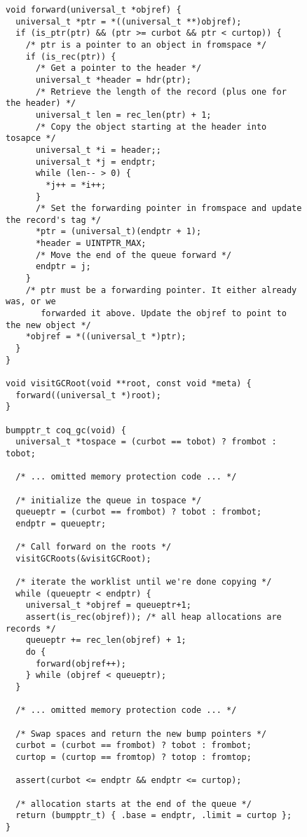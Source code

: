 \documentclass{article}
\begin{document}
\begin{figure}
\begin{lstlisting}
void forward(universal_t *objref) {
  universal_t *ptr = *((universal_t **)objref);
  if (is_ptr(ptr) && (ptr >= curbot && ptr < curtop)) {
    /* ptr is a pointer to an object in fromspace */
    if (is_rec(ptr)) {
      /* Get a pointer to the header */
      universal_t *header = hdr(ptr);
      /* Retrieve the length of the record (plus one for the header) */
      universal_t len = rec_len(ptr) + 1;
      /* Copy the object starting at the header into tosapce */
      universal_t *i = header;;
      universal_t *j = endptr;
      while (len-- > 0) {
        *j++ = *i++;
      }
      /* Set the forwarding pointer in fromspace and update the record's tag */
      *ptr = (universal_t)(endptr + 1);
      *header = UINTPTR_MAX;
      /* Move the end of the queue forward */
      endptr = j;
    }
    /* ptr must be a forwarding pointer. It either already was, or we 
       forwarded it above. Update the objref to point to the new object */
    *objref = *((universal_t *)ptr);
  }
}

void visitGCRoot(void **root, const void *meta) {
  forward((universal_t *)root);
}

bumpptr_t coq_gc(void) {
  universal_t *tospace = (curbot == tobot) ? frombot : tobot;

  /* ... omitted memory protection code ... */

  /* initialize the queue in tospace */
  queueptr = (curbot == frombot) ? tobot : frombot;
  endptr = queueptr;

  /* Call forward on the roots */
  visitGCRoots(&visitGCRoot);

  /* iterate the worklist until we're done copying */
  while (queueptr < endptr) {
    universal_t *objref = queueptr+1;
    assert(is_rec(objref)); /* all heap allocations are records */
    queueptr += rec_len(objref) + 1;
    do {
      forward(objref++);
    } while (objref < queueptr);
  }

  /* ... omitted memory protection code ... */

  /* Swap spaces and return the new bump pointers */
  curbot = (curbot == frombot) ? tobot : frombot;
  curtop = (curtop == fromtop) ? totop : fromtop;

  assert(curbot <= endptr && endptr <= curtop);

  /* allocation starts at the end of the queue */
  return (bumpptr_t) { .base = endptr, .limit = curtop };
}
\end{lstlisting}
\end{figure}
\end{document}
